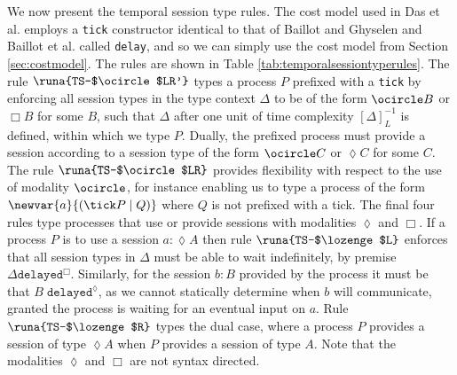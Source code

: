 We now present the temporal session type rules. The cost model used in Das et al. \cite{DasEtAl2018} employs a \texttt{tick} constructor identical to that of Baillot and Ghyselen \cite{BaillotGhyselen2021} and Baillot et al. \cite{BaillotEtAl2021} called \texttt{delay}, and so we can simply use the cost model from Section \ref{sec:costmodel}. The rules are shown in Table \ref{tab:temporalsessiontyperules}. The rule $\runa{TS-$\ocircle$LR'}$ types a process $P$ prefixed with a \texttt{tick} by enforcing all session types in the type context $\Delta$ to be of the form $\ocircle B$ or $\Box B$ for some $B$, such that $\Delta$ after one unit of time complexity $[\Delta]^{-1}_L$ is defined, within which we type $P$. Dually, the prefixed process must provide a session according to a session type of the form $\ocircle C$ or $\lozenge C$ for some $C$. The rule $\runa{TS-$\ocircle$LR}$ provides flexibility with respect to the use of modality $\ocircle$, for instance enabling us to type a process of the form $\newvar{a}{(\tick P \mid Q)}$ where $Q$ is not prefixed with a tick. The final four rules type processes that use or provide sessions with modalities $\lozenge$ and $\Box$. If a process $P$ is to use a session $a : \lozenge A$ then rule $\runa{TS-$\lozenge$L}$ enforces that all session types in $\Delta$ must be able to wait indefinitely, by premise $\Delta \texttt{delayed}^\Box$. Similarly, for the session $b : B$ provided by the process it must be that $B\;\texttt{delayed}^\lozenge$, as we cannot statically determine when $b$ will communicate, granted the process is waiting for an eventual input on $a$. Rule $\runa{TS-$\lozenge$R}$ types the dual case, where a process $P$ provides a session of type $\lozenge A$ when $P$ provides a session of type $A$. Note that the modalities $\lozenge$ and $\Box$ are not syntax directed.


